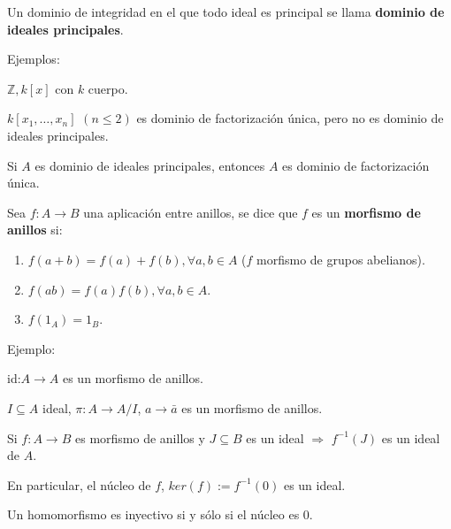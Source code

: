 \begin{Def}
Un dominio de integridad en el que todo ideal es principal se llama \textbf{dominio de ideales principales}.
\end{Def}

Ejemplos:
\begin{itemize*}
\item $\mathbb{Z},k[x]$ con $k$ cuerpo.
\item $k[x_1, \dots, x_n]$ $(n \le 2)$ es dominio de factorización única, pero no es dominio de ideales principales.
\end{itemize*}

\begin{nota}
Si $A$ es dominio de ideales principales, entonces $A$ es dominio de factorización única.
\end{nota}


\begin{Def}
Sea $f: A \rightarrow B$ una aplicación entre anillos, se dice que $f$ es un \textbf{morfismo de anillos} si:

\begin{enumerate}
\item $f(a+b) = f(a)+f(b), \forall a,b \in A$ ($f$ morfismo de grupos abelianos).
\item $f(ab)=f(a)f(b), \forall a,b \in A$.
\item $f(1_A)=1_B$.
\end{enumerate}
\end{Def}

Ejemplo:

\begin{itemize*}
\item id:$A\rightarrow A$ es un morfismo de anillos.
\item $I \subseteq A$ ideal, $\pi : A \rightarrow A/ I$, $a\rightarrow \bar{a}$ es un morfismo de anillos.
\end{itemize*}

\begin{Prop}
Si $f:A \rightarrow B$ es morfismo de anillos y $J\subseteq B$ es un ideal $\Rightarrow $ $f^{-1}(J)$ es un ideal de $A$.
\end{Prop}

En particular, el núcleo de $f$, $ker(f):=f^{-1}(0)$ es un ideal.

\begin{nota}
Un homomorfismo es inyectivo si y sólo si el núcleo es 0.
\end{nota}

